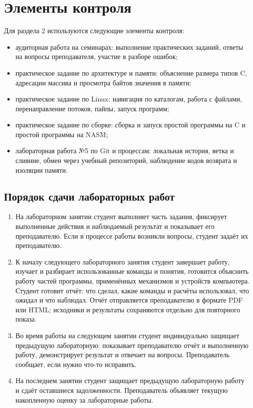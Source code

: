 \documentclass[a4paper,14pt]{extreport}
\begin{document}
\chapter{Элементы контроля}

Для раздела 2 используются следующие элементы контроля:

\begin{itemize}
    \item аудиторная работа на семинарах: выполнение практических заданий, ответы на вопросы преподавателя, участие в разборе ошибок;
    \item практическое задание по архитектуре и памяти: объяснение размера типов C, адресации массива и просмотра байтов значения в памяти;
    \item практическое задание по Linux: навигация по каталогам, работа с файлами, перенаправление потоков, пайпы, запуск программ;
    \item практическое задание по сборке: сборка и запуск простой программы на C и простой программы на NASM;
    \item лабораторная работа №5 по Git и процессам: локальная история, ветка и слияние, обмен через учебный репозиторий, наблюдение кодов возврата и изоляции памяти.
\end{itemize}

\section*{Порядок сдачи лабораторных работ}

\begin{enumerate}
    \item На лабораторном занятии студент выполняет часть задания, фиксирует выполненные действия и наблюдаемый результат и показывает его преподавателю. Если в процессе работы возникли вопросы, студент задаёт их преподавателю.
    \item К началу следующего лабораторного занятия студент завершает работу, изучает и разбирает использованные команды и понятия, готовится объяснить работу частей программы, применённых механизмов и устройств компьютера. Студент готовит отчёт: что сделал, какие команды и расчёты использовал, что ожидал и что наблюдал. Отчёт отправляется преподавателю в формате PDF или HTML; исходники и результаты сохраняются отдельно для повторного показа.
    \item Во время работы на следующем занятии студент индивидуально защищает предыдущую лабораторную: показывает преподавателю отчёт и выполненную работу, демонстрирует результат и отвечает на вопросы. Преподаватель сообщает, если нужно что-то исправить.
    \item На последнем занятии студент защищает предыдущую лабораторную работу и сдаёт оставшиеся задолженности. Преподаватель объявляет текущую накопленную оценку за лабораторные работы.
\end{enumerate}
\end{document}
